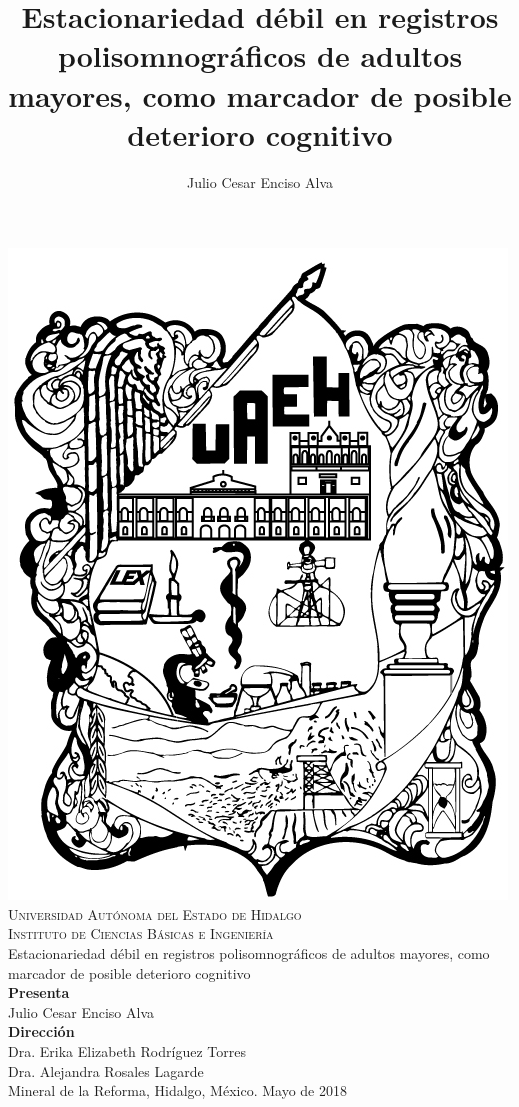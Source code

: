 \documentclass[12pt,letterpaper]{book}
\begin{document}
\setcounter{page}{0}
\thispagestyle{empty}

\title{Estacionariedad débil en registros polisomnográficos de adultos mayores,
como marcador de posible deterioro cognitivo}
\author{Julio Cesar Enciso Alva}

\begin{center}
    \includegraphics[width=0.2\linewidth]{./img_oficiales/logo_uaeh.png}\\
    
    {\large 
        \textsc{
            Universidad Autónoma del Estado de Hidalgo\\
            Instituto de Ciencias Básicas e Ingeniería\\
        }
    }
\vspace*{2.5em}
    {\huge
        Estacionariedad débil en registros polisomnográficos de adultos mayores,
        como marcador de posible deterioro cognitivo\\
    }
\vspace*{2.5em}
    {\large
        \textbf{Presenta}\\
    }
\vspace*{.25em}
    {\Large
        Julio Cesar Enciso Alva\\
    }
\vspace*{3em}
    {\large
        \textbf{Dirección}\\
    }
\vspace*{.25em}
    {\Large
        Dra. Erika Elizabeth Rodríguez Torres\\
        Dra. Alejandra Rosales Lagarde\\
    }
\vspace*{3em}
    {\large
        Mineral de la Reforma, Hidalgo, México. Mayo de 2018
    }
\end{center}

\newpage

\newpage
\thispagestyle{empty}
\mbox{}

\end{document}
